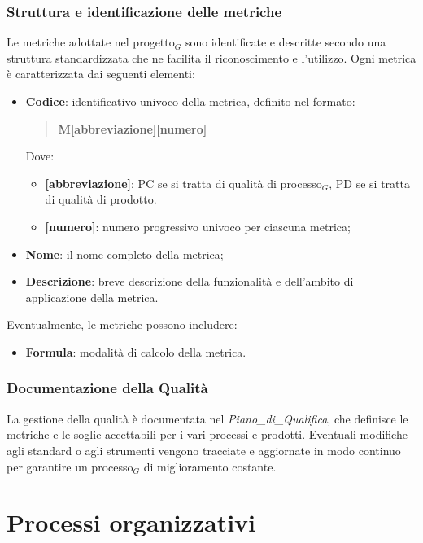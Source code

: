 \documentclass[10pt]{article}
\begin{document}
\begin{justify}
    \subsubsection{Struttura e identificazione delle metriche}
    Le metriche adottate nel progetto$_G$ sono identificate e descritte secondo una struttura standardizzata che ne facilita il riconoscimento e l'utilizzo. Ogni metrica è caratterizzata dai seguenti elementi:
    \begin{itemize}
        \item \textbf{Codice}: identificativo univoco della metrica, definito nel formato:
    \begin{quote}
        \textbf{M[abbreviazione][numero]}
    \end{quote}
    Dove:
    \begin{itemize}
        \item \textbf{[abbreviazione]}: PC se si tratta di qualità di processo$_G$, PD se si tratta di qualità di prodotto.
        \item \textbf{[numero]}: numero progressivo univoco per ciascuna metrica;
    \end{itemize}
    
    \item \textbf{Nome}: il nome completo della metrica;
    \item \textbf{Descrizione}: breve descrizione della funzionalità e dell'ambito di applicazione della metrica.
\end{itemize}

Eventualmente, le metriche possono includere:
\begin{itemize}
    \item \textbf{Formula}: modalità di calcolo della metrica.
\end{itemize}
    
    \subsubsection{Documentazione della Qualità}
    La gestione della qualità è documentata nel \textit{Piano\_di\_Qualifica}, che definisce le metriche e le soglie accettabili per i vari processi e prodotti. Eventuali modifiche agli standard o agli strumenti vengono tracciate e aggiornate in modo continuo per garantire un processo$_G$ di miglioramento costante.

\newpage
\section{Processi organizzativi}

\end{justify}
\end{document}
